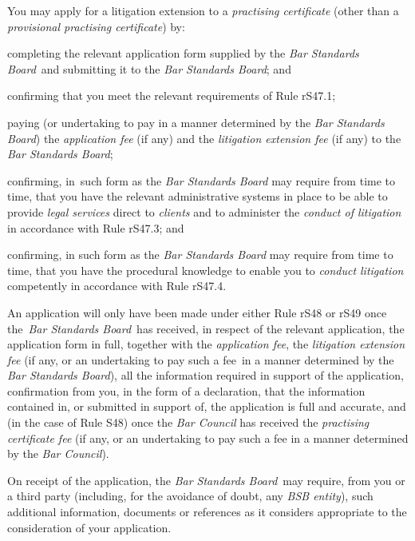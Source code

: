 
You may apply for a litigation extension to a \emph{practising
certificate} (other than a \emph{provisional practising certificate})
by:\nl\item completing the relevant application form supplied by the \emph{Bar
Standards Board}~and submitting it to the \emph{Bar Standards Board};
and
\item confirming that you meet the relevant requirements of Rule rS47.1;
\item paying (or undertaking to pay in a manner determined by the \emph{Bar
Standards Board}) the \emph{application fee} (if any) and the
\emph{litigation extension fee} (if any) to the \emph{Bar Standards
Board};
\item confirming, in~such form as the \emph{Bar Standards Board} may
require from time to time, that you have the relevant administrative
systems in place to be able to provide \emph{legal services} direct to
\emph{clients} and to administer the \emph{conduct of litigation} in
accordance with Rule rS47.3; and
\item confirming, in such form as the \emph{Bar Standards Board} may
require from time to time, that you have the procedural knowledge to
enable you to \emph{conduct litigation} competently in accordance with
Rule rS47.4.
\ln
{}

An application will only have been made under either Rule rS48 or rS49
once the~\emph{Bar Standards Board}~has received, in respect of the
relevant application, the application form in full, together with the
\emph{application fee}, the \emph{litigation extension fee} (if any, or
an undertaking to pay such a fee~in a manner determined by the \emph{Bar
Standards Board}), all the information required in support of the
application, confirmation from you, in the form of a declaration, that
the information contained in, or submitted in support of, the
application is full and accurate, and (in the case of Rule S48) once the
\emph{Bar Council} has received the \emph{practising certificate fee}
(if any, or an undertaking to pay such a fee in a manner determined by
the \emph{Bar Council}).


On receipt of the application, the \emph{Bar Standards Board}~may
require, from you or a third party (including, for the avoidance of
doubt, any \emph{BSB entity}), such additional information, documents or
references as it considers appropriate to the consideration of your
application.

